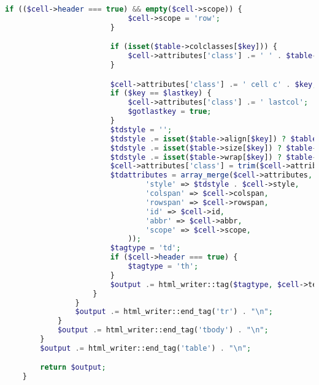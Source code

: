 \begin{lstlisting}[language=PHP]
                        if (($cell->header === true) && empty($cell->scope)) {
                            $cell->scope = 'row';
                        }

                        if (isset($table->colclasses[$key])) {
                            $cell->attributes['class'] .= ' ' . $table->colclasses[$key];
                        }

                        $cell->attributes['class'] .= ' cell c' . $key;
                        if ($key == $lastkey) {
                            $cell->attributes['class'] .= ' lastcol';
                            $gotlastkey = true;
                        }
                        $tdstyle = '';
                        $tdstyle .= isset($table->align[$key]) ? $table->align[$key] : '';
                        $tdstyle .= isset($table->size[$key]) ? $table->size[$key] : '';
                        $tdstyle .= isset($table->wrap[$key]) ? $table->wrap[$key] : '';
                        $cell->attributes['class'] = trim($cell->attributes['class']);
                        $tdattributes = array_merge($cell->attributes, array(
                                'style' => $tdstyle . $cell->style,
                                'colspan' => $cell->colspan,
                                'rowspan' => $cell->rowspan,
                                'id' => $cell->id,
                                'abbr' => $cell->abbr,
                                'scope' => $cell->scope,
                            ));
                        $tagtype = 'td';
                        if ($cell->header === true) {
                            $tagtype = 'th';
                        }
                        $output .= html_writer::tag($tagtype, $cell->text, $tdattributes) . "\n";
                    }
                }
                $output .= html_writer::end_tag('tr') . "\n";
            }
            $output .= html_writer::end_tag('tbody') . "\n";
        }
        $output .= html_writer::end_tag('table') . "\n";

        return $output;
    }


\end{lstlisting}
